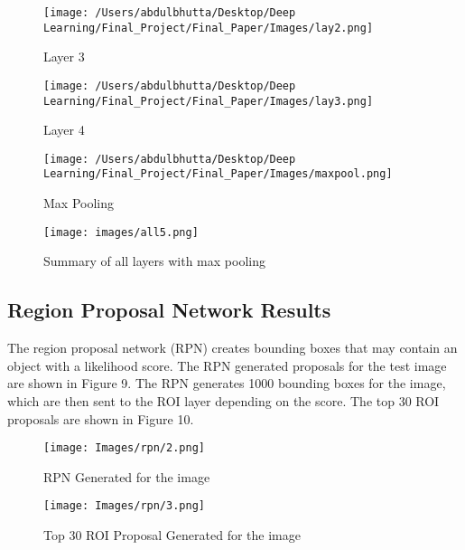 \documentclass[conference]{IEEEtran}
\begin{document}
            \begin{figure}
                \centering
                \texttt{[image: /Users/abdulbhutta/Desktop/Deep Learning/Final\_Project/Final\_Paper/Images/lay2.png]}
                \caption{Layer 3}
                \label{fig:my_label}
            \end{figure}

            \begin{figure}
                \centering
                \texttt{[image: /Users/abdulbhutta/Desktop/Deep Learning/Final\_Project/Final\_Paper/Images/lay3.png]}
                \caption{Layer 4}
                \label{fig:my_label}
            \end{figure}

            \begin{figure}
                \centering
                \texttt{[image: /Users/abdulbhutta/Desktop/Deep Learning/Final\_Project/Final\_Paper/Images/maxpool.png]}
                \caption{Max Pooling}
                \label{fig:my_label}
            \end{figure}

            \begin{figure}
                \centering
                \texttt{[image: images/all5.png]}
                \caption{Summary of all layers with max pooling}
                \label{fig:my_label}
            \end{figure}
            \FloatBarrier

\subsection{Region Proposal Network Results}
The region proposal network (RPN) creates bounding boxes that may contain an object with a likelihood score. The RPN generated proposals for 
the test image are shown in Figure 9. The RPN generates 1000 bounding boxes for the image, which are then sent to the ROI layer depending on 
the score. The top 30 ROI proposals are shown in Figure 10.

    \begin{figure}[!htbp]
        \centering
        \texttt{[image: Images/rpn/2.png]}
        \caption{RPN Generated for the image}
        \label{fig:my_label}
    \end{figure}

    \begin{figure}[!htbp]
        \centering
        \texttt{[image: Images/rpn/3.png]}
        \caption{Top 30 ROI Proposal Generated for the image}
        \label{fig:my_label}
    \end{figure}
    \FloatBarrier
    
\end{document}
